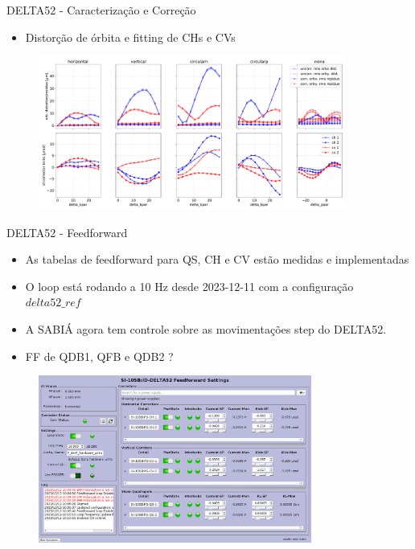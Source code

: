\documentclass[aspectratio=169]{beamer}					  %
\begin{document}
\begin{frame}{DELTA52 - Caracterização e Correção}
    \begin{itemize}
    		\item Distorção de órbita e fitting de CHs e CVs
    \end{itemize}
    \begin{figure}[H]
        	\centering
            \includegraphics[width=0.9\textwidth]{2023-12-12/figures/orbcorr_ff.pdf}
            \label{fig:bba}
    \end{figure} 
\end{frame}

\begin{frame}{DELTA52 - Feedforward}
    \scriptsize{\begin{itemize}
    		\item As tabelas de feedforward para QS, CH e CV estão medidas e implementadas
            \item O loop está rodando a 10 Hz desde 2023-12-11 com a configuração $delta52\_ref$
            \item A SABIÁ agora tem controle sobre as movimentações step do DELTA52.
            \item FF de QDB1, QFB e QDB2 ?
    \end{itemize}}
    \begin{figure}[H]
        	\centering
            \includegraphics[width=0.8\textwidth]{2023-12-12/figures/idff.png}
            \label{fig:bba}
    \end{figure} 
\end{frame}
\end{document}

